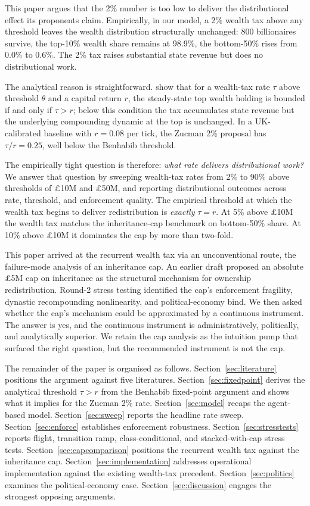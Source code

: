 \documentclass[11pt]{article}
\begin{document}
This paper argues that the 2\% number is too low to deliver the
distributional effect its proponents claim.  Empirically, in our
model, a 2\% wealth tax above any threshold leaves the wealth
distribution structurally unchanged: 800 billionaires survive, the
top-10\% wealth share remains at 98.9\%, the bottom-50\% rises
from 0.0\% to 0.6\%.  The 2\% tax raises substantial state revenue
but does no distributional work.

The analytical reason is straightforward.
\citet{benhabib2011distribution} show that for a wealth-tax rate
$\tau$ above threshold $\theta$ and a capital return $r$, the
steady-state top wealth holding is bounded if and only if $\tau >
r$; below this condition the tax accumulates state revenue but the
underlying compounding dynamic at the top is unchanged.  In a
UK-calibrated baseline with $r = 0.08$ per tick, the Zucman 2\%
proposal has $\tau / r = 0.25$, well below the Benhabib threshold.

The empirically tight question is therefore: \emph{what rate
delivers distributional work?}  We answer that question by
sweeping wealth-tax rates from 2\% to 90\% above thresholds of
\pounds 10M and \pounds 50M, and reporting distributional outcomes
across rate, threshold, and enforcement quality.  The empirical
threshold at which the wealth tax begins to deliver redistribution
is \emph{exactly} $\tau = r$.  At 5\% above \pounds 10M the
wealth tax matches the inheritance-cap benchmark on bottom-50\%
share.  At 10\% above \pounds 10M it dominates the cap by more
than two-fold.

This paper arrived at the recurrent wealth tax via an unconventional
route, the failure-mode analysis of an inheritance cap.  An earlier
draft proposed an absolute \pounds 5M cap on inheritance as the
structural mechanism for ownership redistribution.  Round-2 stress
testing identified the cap's enforcement fragility, dynastic
recompounding nonlinearity, and political-economy bind.  We then
asked whether the cap's mechanism could be approximated by a
continuous instrument.  The answer is yes, and the continuous
instrument is administratively, politically, and analytically
superior.  We retain the cap analysis as the intuition pump that
surfaced the right question, but the recommended instrument is
not the cap.

The remainder of the paper is organised as follows.
Section~\ref{sec:literature} positions the argument against five
literatures.  Section~\ref{sec:fixedpoint} derives the analytical
threshold $\tau > r$ from the Benhabib fixed-point argument and
shows what it implies for the Zucman 2\% rate.
Section~\ref{sec:model} recaps the agent-based model.
Section~\ref{sec:sweep} reports the headline rate sweep.
Section~\ref{sec:enforce} establishes enforcement robustness.
Section~\ref{sec:stresstests} reports flight, transition ramp,
class-conditional, and stacked-with-cap stress tests.
Section~\ref{sec:capcomparison} positions the recurrent wealth
tax against the inheritance cap.
Section~\ref{sec:implementation} addresses operational
implementation against the existing wealth-tax precedent.
Section~\ref{sec:politics} examines the political-economy case.
Section~\ref{sec:discussion} engages the strongest opposing
arguments.
\end{document}
